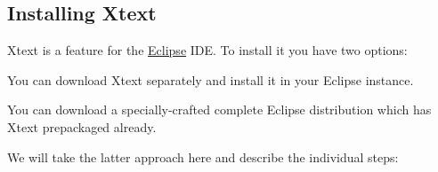 \subsection{Installing Xtext}

Xtext is a feature for the \href{http://www.eclipse.org/}{Eclipse} IDE. To
install it you have two options:

\begin{compactitem}
    \item You can download Xtext separately and install it in your Eclipse
    instance.
    \item You can download a specially-crafted complete Eclipse distribution
    which has Xtext prepackaged already.
\end{compactitem}

We will take the latter approach here and describe the individual steps:

